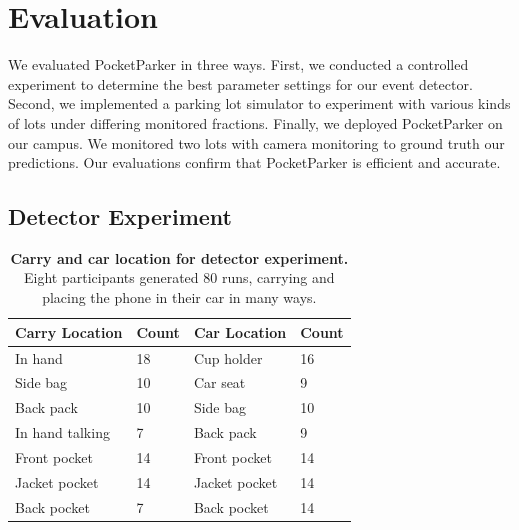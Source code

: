 \documentclass{sigchi}
\begin{document}
\newpage

\section{Evaluation}

We evaluated PocketParker in three ways. First, we conducted a controlled
experiment to determine the best parameter settings for our event detector.
Second, we implemented a parking lot simulator to experiment with various
kinds of lots under differing monitored fractions. Finally, we deployed
PocketParker on our campus. We monitored two lots with camera monitoring to
ground truth our predictions. Our evaluations confirm that PocketParker is
efficient and accurate.

\subsection{Detector Experiment}

\begin{table}[t]
{\small
\begin{threeparttable}
\begin{tabularx}{\columnwidth}{b s b s}
  {{\textbf{Carry Location}}} & {{\textbf{Count}}} &
  {{\textbf{Car Location}}} &
  {{\textbf{Count}}} \\
 \hline
In hand & 18 & Cup holder & 16 \\
Side bag & 10 & Car seat  & 9 \\
Back pack & 10 & Side bag & 10 \\
In hand talking & 7 & Back pack & 9 \\
Front pocket & 14 & Front pocket & 14 \\
Jacket pocket & 14 & Jacket pocket & 14 \\
Back pocket & 7 & Back pocket & 14 \\
\end{tabularx}
\end{threeparttable}
\caption{\textbf{Carry and car location for detector experiment.}
Eight participants generated 80 runs, carrying and placing the
phone in their car in many ways.}
\label{table-experiment}
}
\vspace*{-0.1in}
\end{table}

\end{document}
